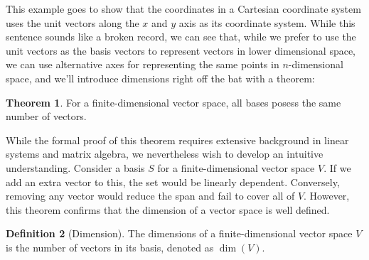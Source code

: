 \documentclass[12pt]{article}
\theoremstyle{definition}
\newtheorem{theorem}{Theorem}[section]
\newtheorem{definition}[theorem]{Definition}
\begin{document}
This example goes to show that the coordinates in a Cartesian coordinate system uses the unit vectors along the $x$ and $y$ axis as its coordinate system. While this sentence sounds like a broken record, we can see that, while we prefer to use the unit vectors as the basis vectors to represent vectors in lower dimensional space, we can use alternative axes for representing the same points in $n$-dimensional space, and we'll introduce dimensions right off the bat with a theorem:

\begin{theorem}
    For a finite-dimensional vector space, all bases posess the same number of vectors. 
\end{theorem}

While the formal proof of this theorem requires extensive background in linear systems and matrix algebra, we nevertheless wish to develop an intuitive understanding. Consider a basis $S$ for a finite-dimensional vector space $V$. If we add an extra vector to this, the set would be linearly dependent. Conversely, removing any vector would reduce the span and fail to cover all of $V$. However, this theorem confirms that the dimension of a vector space is well defined.

\begin{definition}[Dimension]
    The dimensions of a finite-dimensional vector space $V$ is the number of vectors in its basis, denoted as $\dim(V)$. 
\end{definition}
\end{document}
